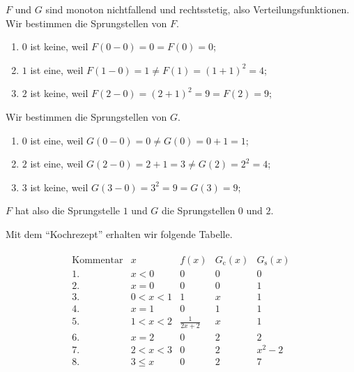 \begin{solution}

$F$ und $G$ sind monoton nichtfallend und rechtsstetig, also Verteilungsfunktionen.
Wir bestimmen die Sprungstellen von $F$.

\begin{enumerate}
    \item $0$ ist keine, weil $F(0 - 0) = 0 = F(0) = 0$;
    \item $1$ ist eine,  weil $F(1 - 0) = 1 \neq F(1) = (1 + 1)^2 = 4$;
    \item $2$ ist keine, weil $F(2 - 0) = (2 + 1)^2 = 9 = F(2) = 9$;
\end{enumerate}

Wir bestimmen die Sprungstellen von $G$.

\begin{enumerate}
    \item $0$ ist eine,  weil $G(0 - 0) = 0 \neq G(0) = 0 + 1 = 1$;
    \item $2$ ist eine,  weil $G(2 - 0) = 2 + 1 = 3 \neq G(2) = 2^2 = 4$;
    \item $3$ ist keine, weil $G(3 - 0) = 3^2 = 9 = G(3) = 9$;
\end{enumerate}

$F$ hat also die Sprungstelle $1$ und $G$ die Sprungstellen $0$ und $2$.

Mit dem \enquote{Kochrezept} erhalten wir folgende Tabelle.

\begin{align*}
    \begin{array}{c|c|c|c|c}
        \text{Kommentar}  & x         & f(x)              & G_\mathrm{c}(x) & G_\mathrm{s}(x) \\ \hline
        1.                & x < 0     & 0                 & 0               & 0               \\
        2.                & x = 0     & 0                 & 0               & 1               \\
        3.                & 0 < x < 1 & 1                 & x               & 1               \\
        4.                & x = 1     & 0                 & 1               & 1               \\
        5.                & 1 < x < 2 & \frac{1}{2 x + 2} & x               & 1               \\
        6.                & x = 2     & 0                 & 2               & 2               \\
        7.                & 2 < x < 3 & 0                 & 2               & x^2 - 2         \\
        8.                & 3 \leq x  & 0                 & 2               & 7
    \end{array}
\end{align*}


\end{solution}
